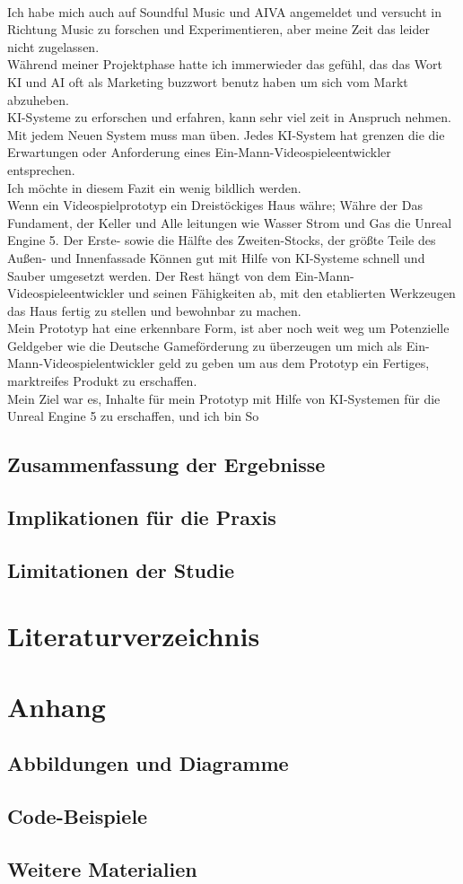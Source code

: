 \documentclass[10pt,a4paper,bibliography=totocnumbered,listof=totocnumbered]{scrartcl}
\begin{document}
\\
Ich habe mich auch auf Soundful Music und AIVA angemeldet und versucht in Richtung Music zu forschen und Experimentieren, aber meine Zeit das leider nicht zugelassen.
\\
Während meiner Projektphase hatte ich immerwieder das gefühl, das das Wort KI und AI oft als Marketing buzzwort benutz haben um sich vom Markt abzuheben.
\\
KI-Systeme zu erforschen und erfahren, kann sehr viel zeit in Anspruch nehmen. Mit jedem Neuen System muss man üben. Jedes KI-System hat grenzen die die Erwartungen oder Anforderung eines Ein-Mann-Videospieleentwickler entsprechen.
\\
Ich möchte in diesem Fazit ein wenig bildlich werden.
\\
Wenn ein Videospielprototyp ein Dreistöckiges Haus währe; Währe der Das Fundament, der Keller und Alle leitungen wie Wasser Strom und Gas die Unreal Engine 5.
Der Erste- sowie die Hälfte des Zweiten-Stocks, der größte Teile des Außen- und Innenfassade Können gut mit Hilfe von KI-Systeme schnell und Sauber umgesetzt werden.
Der Rest hängt von dem Ein-Mann-Videospieleentwickler und seinen Fähigkeiten ab, mit den etablierten Werkzeugen das Haus fertig zu stellen und bewohnbar zu machen.
\\
Mein Prototyp hat eine erkennbare Form, ist aber noch weit weg um Potenzielle Geldgeber wie die Deutsche Gameförderung zu überzeugen um mich als Ein-Mann-Videospielentwickler geld zu geben um aus dem Prototyp ein Fertiges, marktreifes Produkt zu erschaffen.
\\
Mein Ziel war es, Inhalte für mein Prototyp mit Hilfe von KI-Systemen für die Unreal Engine 5 zu erschaffen, und ich bin So
\subsection{Zusammenfassung der Ergebnisse}
\subsection{Implikationen für die Praxis}
\subsection{Limitationen der Studie}
\section{Literaturverzeichnis}
\section{Anhang}
\subsection{Abbildungen und Diagramme}
\subsection{Code-Beispiele}
\subsection{Weitere Materialien}
\end{document}
